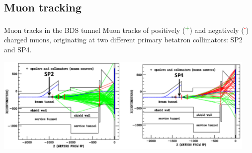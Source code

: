 \documentclass[xcolor={dvipsnames}]{beamer}
\begin{document}
\subsection{Muon tracking}
\begin{frame}{Muon tracks in the BDS tunnel}
Muon tracks of positively (\textcolor{green}{\textmu\textsuperscript{+}}) and negatively (\textcolor{red}{\textmu\textsuperscript{-}}) charged muons, originating at two different primary betatron collimators: SP2 and SP4.
\begin{center}
\includegraphics[width=0.95\textwidth]{Muon_tracks.pdf}
\end{center}
\end{frame}
\end{document}
